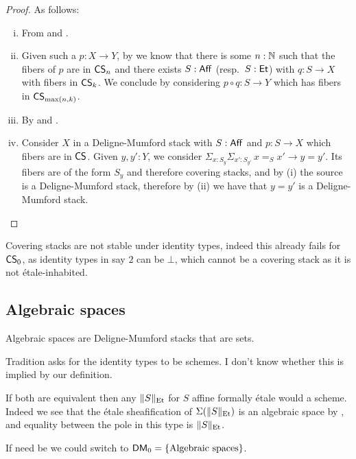 \begin{proof}
As follows:

\begin{enumerate}[(i)]
\item From  and .
\item Given such a $p:X\to Y$, by  we know that there is some $n:\mathbb{N}$ such that the fibers of $p$ are in $\mathsf{CS}_n$ and there exists $S:\mathsf{Aff}$ (resp.\ $S:\mathsf{Et}$) with $q:S\to X$ with fibers in $\mathsf{CS}_k$. We conclude by considering $p\circ q:S\to Y$ which has fibers in $\mathsf{CS}_{\max(n,k)}$.
\item By  and .
\item Consider $X$ in a Deligne-Mumford stack with $S:\mathsf{Aff}$ and $p:S\to X$ which fibers are in $\mathsf{CS}$. Given $y,y':Y$, we consider $\Sigma_{x:S_y}\Sigma_{x':S_{y'}}\, x=_Sx' \to y=y'$. Its fibers are of the form $S_y$ and therefore covering stacks, and by (i) the source is a Deligne-Mumford stack, therefore by (ii) we have that $y=y'$ is a Deligne-Mumford stack.
\end{enumerate}
\end{proof}

\begin{remark}
Covering stacks are not stable under identity types, indeed this already fails for $\mathsf{CS}_0$, as identity types in say $2$ can be $\bot$, which cannot be a covering stack as it is not étale-inhabited.
\end{remark}


\subsection{Algebraic spaces}

\begin{definition}
Algebraic spaces are Deligne-Mumford stacks that are sets.
\end{definition}

\begin{remark}
Tradition asks for the identity types to be schemes. I don't know whether this is implied by our definition.

If both are equivalent then any $\lVert S \rVert_{\mathrm{Et}}$ for $S$ affine formally étale would a scheme. Indeed we see that the étale sheafification of $\Sigma(\lVert S \rVert_{\mathrm{Et}})$ is an algebraic space by , and equality between the pole in this type is $\lVert S \rVert_{\mathrm{Et}}$.

If need be we could switch to $\mathsf{DM}_0 = \{\mathrm{Algebraic\ spaces}\}$.
\end{remark}

